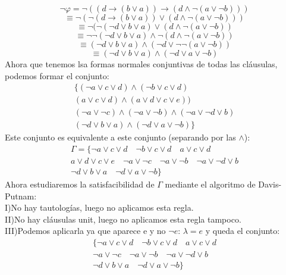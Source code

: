 \documentclass[a4paper]{article}
\begin{document}
$$\neg\varphi=\neg((d\rightarrow(b\lor a))\rightarrow(d\land\neg(a\lor\neg b)))$$
$$\equiv\neg(\neg(d\rightarrow(b\lor a))\lor(d\land\neg(a\lor\neg b)))$$
$$\equiv\neg(\neg(\neg d\lor b\lor a)\lor(d\land\neg(a\lor\neg b))$$
$$\equiv\neg\neg(\neg d\lor b\lor a)\land\neg(d\land\neg(a\lor\neg b))$$
$$\equiv(\neg d\lor b\lor a)\land(\neg d\lor\neg\neg(a\lor\neg b))$$
$$\equiv(\neg d\lor b\lor a)\land(\neg d\lor a\lor\neg b)$$
Ahora que tenemos lsa formas normales conjuntivas de todas las cláusulas, podemos formar el conjunto:
\begin{equation}
\begin{split}
\{(\neg a\lor c\lor d) \land (\neg b\lor c \lor d)\\(a\lor c\lor d)\land(a\lor d\lor c\lor e))\\ (\neg a\lor\neg c)\land(\neg a\lor \neg b)\land(\neg a\lor\neg d\lor b)\\ (\neg d\lor b\lor a)\land(\neg d\lor a\lor\neg b)\}
\end{split}
\end{equation}
Este conjunto es equivalente a este conjunto (separando por las $\land$):
\begin{equation}
\begin{split}
\Gamma=\{\neg a\lor c\lor d \quad \neg b\lor c \lor d\quad a\lor c\lor d\\a\lor d\lor c\lor e\quad \neg a\lor\neg c\quad\neg a\lor \neg b\quad\neg a\lor\neg d\lor b\\ \neg d\lor b\lor a\quad \neg d\lor a\lor\neg b \}
\end{split}
\end{equation}
Ahora estudiaremos la satisfacibilidad de  $\Gamma$ mediante el algoritmo de Davis-Putnam:\\
I)No hay tautologías, luego no aplicamos esta regla.\\
II)No hay cláusulas unit, luego no aplicamos esta regla tampoco.\\
III)Podemos aplicarla ya que aparece e y no $\neg e$: $\lambda=e$ y queda el conjunto:
\begin{equation}
\begin{split}
\{\neg a\lor c\lor d \quad \neg b\lor c \lor d\quad a\lor c\lor d\\ \neg a\lor\neg c\quad\neg a\lor \neg b\quad\neg a\lor\neg d\lor b\\ \neg d\lor b\lor a\quad \neg d\lor a\lor\neg b \}
\end{split}
\end{equation}
\end{document}
